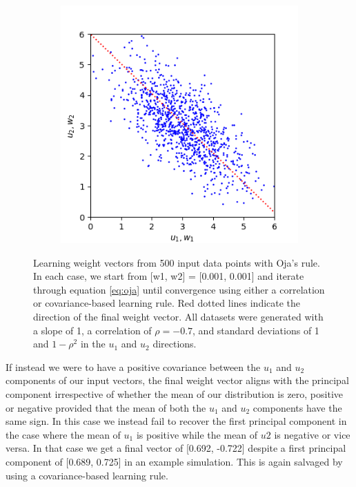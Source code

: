 \documentclass{article}
\begin{document}
\begin{figure}[h]
\begin{subfigure}[t]{0.25\linewidth}
		\label{fig:sim2mul}	
	\end{subfigure}%
	\hspace{0.07\linewidth}
	\begin{subfigure}[t]{0.25\linewidth}
		\centering
		\includegraphics[width = 1.0\linewidth, trim={0 0 25 30}, clip=true]{figures/2d_sim3.png}
		\label{fig:sim3mul}	
	\end{subfigure}%
\caption{Learning weight vectors from 500 input data points with Oja's rule. In each case, we start from [w1, w2] = [0.001, 0.001] and iterate through equation \ref{eq:oja} until convergence using either a correlation or covariance-based learning rule. Red dotted lines indicate the direction of the final weight vector. All datasets were generated with a slope of 1, a correlation of $\rho = -0.7$, and standard deviations of 1 and $1-\rho^2$ in the $u_1$ and $u_2$ directions. }
\label{fig:multiplicative}
\end{figure}

If instead we were to have a positive covariance between the $u_1$ and $u_2$ components of our input vectors, the final weight vector aligns with the principal component irrespective of whether the mean of our distribution is zero, positive or negative provided that the mean of both the $u_1$ and $u_2$ components have the same sign. In this case we instead fail to recover the first principal component in the case where the mean of $u_1$ is positive while the mean of $u2$ is negative or vice versa. In that case we get a final vector of [0.692, -0.722] despite a first principal component of [0.689, 0.725] in an example simulation. This is again salvaged by using a covariance-based learning rule.
\end{document}
